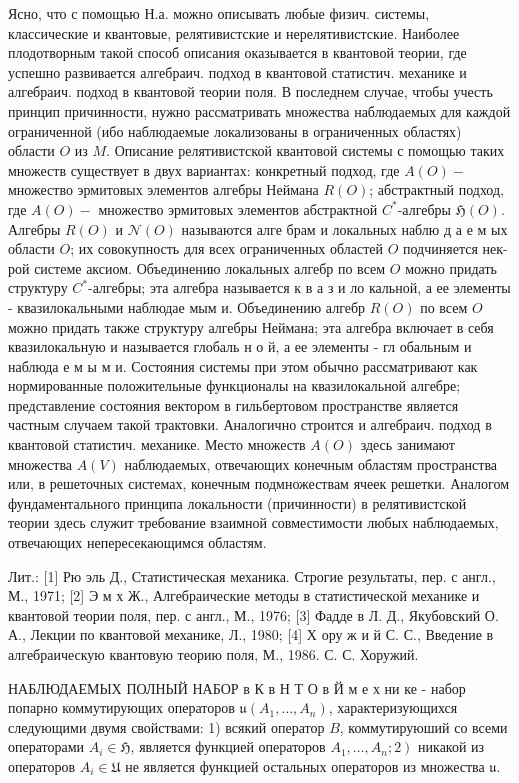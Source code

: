 \documentclass[10pt]{article}
\begin{document}
Ясно, что с помощью Н.а. можно описывать любые физич. системы, классические и квантовые, релятивистские и нерелятивистские. Наиболее плодотворным такой способ описания оказывается в квантовой теории, где успешно развивается алгебраич. подход в квантовой статистич. механике и алгебраич. подход в квантовой теории поля. В последнем случае, чтобы учесть принцип причинности, нужно рассматривать множества наблюдаемых для каждой ограниченной (ибо наблюдаемые локализованы в ограниченных областях) области $O$ из $M$. Описание релятивистской квантовой системы с помощью таких множеств существует в двух вариантах: конкретный подход, где $A(O)-$ множество эрмитовых элементов алгебры Неймана $R(O)$; абстрактный подход, где $A(O)-$ множество эрмитовых элементов абстрактной $C^{*}$-алгебры $\mathfrak{H}(O)$. Алгебры $R(O)$ и $\mathfrak{\mathscr { N }}(O)$ называются алге брам и локальных наблю д а е м ых области $O$; их совокупность для всех ограниченных областей $O$ подчиняется нек-рой системе аксиом. Объединению локальных алгебр по всем $O$ можно придать структуру $C^{*}$-алгебры; эта алгебра называется к в а з и ло кальной, а ее элементы - квазилокальными наблюдае мым и. Объединению алгебр $R(O)$ по всем $O$ можно придать также структуру алгебры Неймана; эта алгебра включает в себя квазилокальную и называется глобаль н о й, а ее элементы - гл обальным и наблюда е м ы м и. Состояния системы при этом обычно рассматривают как нормированные положительные функционалы на квазилокальной алгебре; представление состояния вектором в гильбертовом пространстве является частным случаем такой трактовки. Аналогично строится и алгебраич. подход в квантовой статистич. механике. Место множеств $A(O)$ здесь занимают множества $A(V)$ наблюдаемых, отвечающих конечным областям пространства или, в решеточных системах, конечным подмножествам ячеек решетки. Аналогом фундаментального принципа локальности (причинности) в релятивистской теории здесь служит требование взаимной совместимости любых наблюдаемых, отвечающих непересекающимся областям.



Лит.: [1] Рю эль Д., Статистическая механика. Строгие результаты, пер. с англ., М., 1971; [2] Э м х Ж., Алгебраические методы в статистической механике и квантовой теории поля, пер. с англ., М., 1976; [3] Фадде в Л. Д., Якубовский О. А., Лекции по квантовой механике, Л., 1980; [4] Х ору ж и й С. С., Введение в алгебраическую квантовую теорию поля, М., 1986. С. С. Хоружий.



НАБЛЮДАЕМЫХ ПОЛНЫЙ НАБОР в К в Н Т О в Й м е х ни ке - набор попарно коммутирующих операторов $\mathfrak{u}\left(A_{1}, \ldots, A_{n}\right)$, характеризующихся следующими двумя свойствами: 1) всякий оператор $B$, коммутируюший со всеми операторами $A_{i} \in \mathfrak{H}$, является функцией операторов $\left.A_{1}, \ldots, A_{n} ; 2\right)$ никакой из операторов $A_{i} \in \mathfrak{U}$ не является функцией остальных операторов из множества $\mathfrak{u}$.
\end{document}
